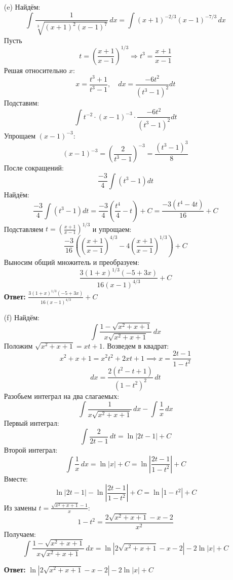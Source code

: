 \documentclass[a4paper]{article}
\begin{document}
\begin{enumerate}
\begin{enumerate}
    \item[(e)]Найдём:
    $$\int \frac{1}{\sqrt[3]{(x+1)^2(x-1)^7}} \, dx = \int (x+1)^{-2/3} (x-1)^{-7/3} \, dx$$
    Пусть
    \[
    t = \left(\frac{x+1}{x-1}\right)^{1/3} \Rightarrow t^3 = \frac{x+1}{x-1}
    \]
    Решая относительно \(x\):
    \[
    x = \frac{t^3 + 1}{t^3 - 1}, \quad dx = \frac{-6t^2}{(t^3 - 1)^2} dt
    \]
    Подставим:
    \[
    \int t^{-2} \cdot (x-1)^{-3} \cdot \frac{-6t^2}{(t^3 - 1)^2} dt
    \]
    Упрощаем \((x-1)^{-3}\):
    \[
    (x-1)^{-3} = \left(\frac{2}{t^3 - 1}\right)^{-3} = \frac{(t^3 - 1)^3}{8}
    \]
    После сокращений:
    \[
    \frac{-3}{4} \int (t^3 - 1) dt
    \]
    Найдём:
    \[
        \frac{-3}{4} \int (t^3 - 1) dt = \frac{-3}{4} \left( \frac{t^4}{4} - t \right) + C = \frac{-3(t^4 - 4t)}{16} + C
    \]
    Подставляем \(t = \left(\frac{x+1}{x-1}\right)^{1/3}\) и упрощаем:
    \[
    \frac{-3}{16} \left( \left(\frac{x+1}{x-1}\right)^{4/3} - 4\left(\frac{x+1}{x-1}\right)^{1/3} \right) + C
    \]
    Выносим общий множитель и преобразуем:
    \[
    \frac{3(1 + x)^{1/3}(-5 + 3x)}{16(x - 1)^{4/3}} + C
    \]
    \textbf{Ответ: } $\frac{3(1 + x)^{1/3}(-5 + 3x)}{16(x - 1)^{4/3}} + C$\\

    \item[(f)]Найдём:
    $$\int \frac{1 - \sqrt{x^2 + x + 1}}{x\sqrt{x^2 + x + 1}} \, dx$$
    Положим \(\sqrt{x^2 + x + 1} = x t + 1\).  
    Возведем в квадрат:  
    \[
    x^2 + x + 1 = x^2 t^2 + 2x t + 1 \implies x = \frac{2t - 1}{1 - t^2}
    \]
    \[
    dx = \frac{2(t^2 - t + 1)}{(1 - t^2)^2} \, dt
    \]
    Разобьем интеграл на два слагаемых:  
    \[
    \int \frac{1}{x\sqrt{x^2 + x + 1}} \, dx - \int \frac{1}{x} \, dx
    \]
    Первый интеграл: 
    \[
    \int \frac{2}{2t - 1} \, dt = \ln|2t - 1| + C
    \]
    Второй интеграл:  
    \[  
    \int \frac{1}{x} \, dx = \ln|x| + C = \ln\left|\frac{2t - 1}{1 - t^2}\right| + C
    \]
    Вместе:
    \[
    \ln|2t - 1| - \ln\left|\frac{2t - 1}{1 - t^2}\right| + C = \ln|1 - t^2| + C
    \]
    Из замены \(t = \frac{\sqrt{x^2 + x + 1} - 1}{x}\):  
    \[
    1 - t^2 = \frac{2\sqrt{x^2 + x + 1} - x - 2}{x^2}
    \]
    Получаем:
    \[
    \int \frac{1 - \sqrt{x^2 + x + 1}}{x\sqrt{x^2 + x + 1}} \, dx = \ln|2\sqrt{x^2 + x + 1} - x - 2| - 2\ln|x| + C
    \]

    \textbf{Ответ: } $\ln|2\sqrt{x^2 + x + 1} - x - 2| - 2\ln|x| + C$\\
    


\end{enumerate}
\end{enumerate}
\end{document}
